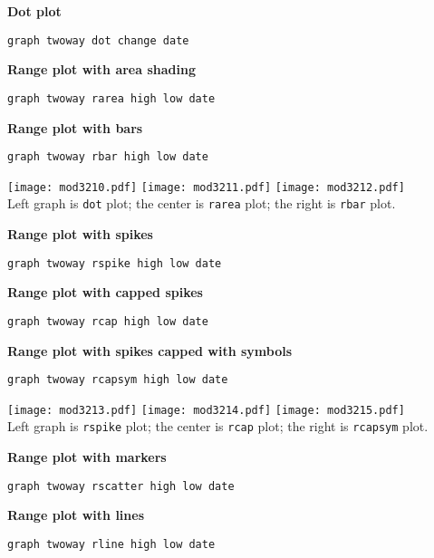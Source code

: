 \textbf{Dot plot}
\begin{lstlisting}
graph twoway dot change date
\end{lstlisting}

\textbf{Range plot with area shading}
\begin{lstlisting}
graph twoway rarea high low date
\end{lstlisting}

\textbf{Range plot with bars}
\begin{lstlisting}
graph twoway rbar high low date
\end{lstlisting}

\begin{center}
\texttt{[image: mod3210.pdf]}
\texttt{[image: mod3211.pdf]}
\texttt{[image: mod3212.pdf]}\\
Left graph is \lstinline{dot} plot; the center is \lstinline{rarea} plot; the right is \lstinline{rbar} plot.
\end{center}

\textbf{Range plot with spikes}
\begin{lstlisting}
graph twoway rspike high low date
\end{lstlisting}

\textbf{Range plot with capped spikes}
\begin{lstlisting}
graph twoway rcap high low date
\end{lstlisting}

\textbf{Range plot with spikes capped with symbols}
\begin{lstlisting}
graph twoway rcapsym high low date
\end{lstlisting}

\begin{center}
\texttt{[image: mod3213.pdf]}
\texttt{[image: mod3214.pdf]}
\texttt{[image: mod3215.pdf]}\\
Left graph is \lstinline{rspike} plot; the center is \lstinline{rcap} plot; the right is \lstinline{rcapsym} plot.
\end{center}

\textbf{Range plot with markers}
\begin{lstlisting}
graph twoway rscatter high low date
\end{lstlisting}

\textbf{Range plot with lines}
\begin{lstlisting}
graph twoway rline high low date
\end{lstlisting}

